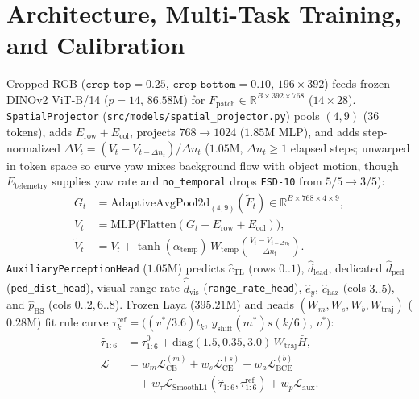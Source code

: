 \documentclass[10pt,twocolumn,letterpaper]{article}
\begin{document}
\section{Architecture, Multi-Task Training, and Calibration}
\label{sec:arch}
Cropped RGB ($\texttt{crop\_top}=0.25$, $\texttt{crop\_bottom}=0.10$, $196 \times 392$) feeds frozen DINOv2 ViT-B/14 ($p=14$, $86.58$M) \cite{oquab2024dinov2,caron2021emerging,dosovitskiy2021image} for $F_{\text{patch}} \in \mathbb{R}^{B \times 392 \times 768}$ ($14 \times 28$). \texttt{SpatialProjector} (\texttt{src/models/spatial\_projector.py}) pools $(4, 9)$ (36 tokens), adds $E_{\text{row}} + E_{\text{col}}$, projects $768 \to 1024$ ($1.85$M MLP), and adds step-normalized $\Delta V_t = (V_t - V_{t-\Delta n_t})/\Delta n_t$ ($1.05$M, $\Delta n_t \ge 1$ elapsed steps; unwarped in token space so curve yaw mixes background flow with object motion, though $E_{\text{telemetry}}$ supplies yaw rate and \texttt{no\_temporal} drops \texttt{FSD-10} from $5/5 \to 3/5$):
\begin{align}
    G_t &= \text{AdaptiveAvgPool2d}_{(4,9)}(\tilde{F}_t) \in \mathbb{R}^{B \times 768 \times 4 \times 9}, \\
    V_t &= \text{MLP}\big(\text{Flatten}(G_t + E_{\text{row}} + E_{\text{col}})\big), \\
    \tilde{V}_t &= V_t + \tanh(\alpha_{\text{temp}})\, W_{\text{temp}}\!\left(\frac{V_t - V_{t-\Delta n_t}}{\Delta n_t}\right).
\end{align}
\texttt{AuxiliaryPerceptionHead} ($1.05$M) predicts $\hat{c}_{\text{TL}}$ (rows $0..1$), $\hat{d}_{\text{lead}}$, dedicated $\hat{d}_{\text{ped}}$ (\texttt{ped\_dist\_head}), visual range-rate $\hat{\dot{d}}_{\text{vis}}$ (\texttt{range\_rate\_head}), $\hat{e}_y$, $\hat{c}_{\text{haz}}$ (cols $3..5$), and $\hat{p}_{\text{BS}}$ (cols $0..2, 6..8$). Frozen Laya ($395.21$M) \cite{laya2024nonautoregressive,warner2024modernbert} and heads $(W_m, W_s, W_b, W_{\text{traj}})$ ($0.28$M) fit rule curve $\tau^{\text{ref}}_k = \big((v^*/3.6)t_k,\, y_{\text{shift}}(m^*)s(k/6),\, v^*\big)$:
\begin{align}
    \hat{\tau}_{1:6} &= \tau^0_{1:6} + \text{diag}(1.5, 0.35, 3.0)\, W_{\text{traj}}\bar{H}, \\
    \mathcal{L} &= w_m \mathcal{L}_{\text{CE}}^{(m)} + w_s \mathcal{L}_{\text{CE}}^{(s)} + w_a \mathcal{L}_{\text{BCE}}^{(b)} \nonumber\\
                &\quad + w_\tau \mathcal{L}_{\text{SmoothL1}}(\hat{\tau}_{1:6}, \tau^{\text{ref}}_{1:6}) + w_p \mathcal{L}_{\text{aux}}.
\end{align}
\end{document}
